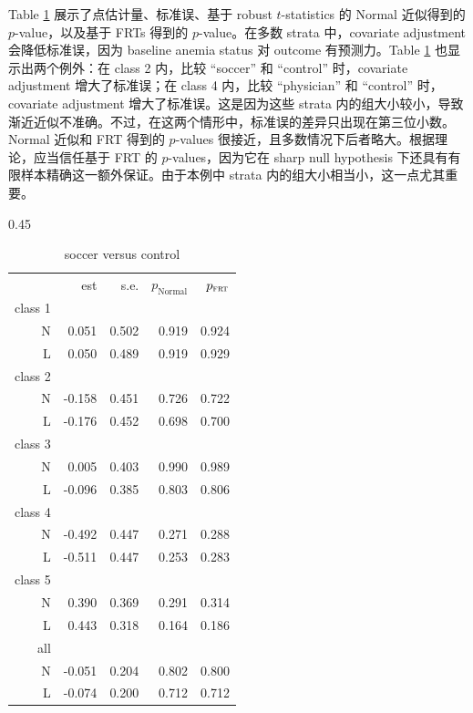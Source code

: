 Table \ref{tb::pv-values-chong} 展示了点估计量、标准误、基于 robust $t$-statistics 的 Normal 近似得到的 $p$-value，以及基于 FRTs 得到的 $p$-value。在多数 strata 中，covariate adjustment 会降低标准误，因为 baseline anemia status 对 outcome 有预测力。Table \ref{tb::pv-values-chong} 也显示出两个例外：在 class 2 内，比较 ``soccer'' 和 ``control'' 时，covariate adjustment 增大了标准误；在 class 4 内，比较 ``physician'' 和 ``control'' 时，covariate adjustment 增大了标准误。这是因为这些 strata 内的组大小较小，导致渐近近似不准确。不过，在这两个情形中，标准误的差异只出现在第三位小数。Normal 近似和 FRT 得到的 $p$-values 很接近，且多数情况下后者略大。根据理论，应当信任基于 FRT 的 $p$-values，因为它在 sharp null hypothesis 下还具有有限样本精确这一额外保证。由于本例中 strata 内的组大小相当小，这一点尤其重要。

\begin{table}
\centering
\caption{重新分析 \citet{chong2016iron} 的数据。``\textsc{N}'' 对应 \citet{Neyman:1923} 的未调整估计量和检验，``\textsc{L}'' 对应 \citet{lin2013} 的 covariate-adjusted 估计量和检验。}\label{tb::pv-values-chong}
\begin{subtable}[h]{0.45\textwidth}
\caption{soccer versus control}
    \begin{tabular}{rrrrr}
    \hline 
   &    est & s.e. &$p_\text{Normal}$ & $p_{\textsc{frt}}$ \\
       class 1& &&&\\
\textsc{N}  &  0.051 &0.502 &     0.919  & 0.924 \\
\textsc{L}   &    0.050 & 0.489 &     0.919 &  0.929 \\
       class 2& &&&\\
\textsc{N}  &  -0.158 &0.451  &    0.726  & 0.722\\
\textsc{L}   &  -0.176 & 0.452   &   0.698  & 0.700 \\
       class 3& &&&\\
\textsc{N}  &  0.005 &0.403  &    0.990 &  0.989 \\
\textsc{L}   &   -0.096& 0.385 &     0.803&   0.806 \\
       class 4& &&&\\
\textsc{N}  &  -0.492& 0.447  &    0.271 &  0.288 \\
\textsc{L}   &    -0.511& 0.447  &    0.253 &  0.283 \\
       class 5& &&&\\
\textsc{N}  &  0.390& 0.369 &     0.291 &  0.314 \\
\textsc{L}   &   0.443 &0.318  &    0.164  & 0.186 \\
       all& &&&\\
\textsc{N}  &  -0.051 & 0.204  &    0.802 &  0.800 \\
\textsc{L}   &    -0.074& 0.200   &   0.712  & 0.712\\
\hline 
    \end{tabular}
\end{subtable}


\end{table}
